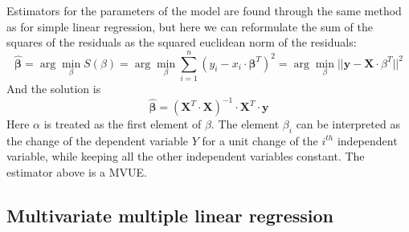 Estimators for the parameters of the model are found through the same method as for simple linear regression, but here we can reformulate the sum of the squares of the residuals as the squared euclidean norm of the residuals:
\begin{equation*}
    \hat{\boldsymbol{\beta}} = \arg \min_{\beta} S(\beta) = \arg \min_{\beta} \sum_{i=1}^n (y_i - x_i \cdot \boldsymbol{\beta}^T)^2 = \arg \min_{\beta} ||\mathbf{y} - \mathbf{X} \cdot \beta^T||^2
\end{equation*}
And the solution is
\begin{equation*}
    \hat{\boldsymbol{\beta}} = (\mathbf{X}^T \cdot \mathbf{X})^{-1} \cdot \mathbf{X}^T \cdot \mathbf{y}
\end{equation*}
Here $\alpha$ is treated as the first element of $\beta$. The element $\beta_i$ can be interpreted as the change of the dependent variable $Y$ for a unit change of the $i^{th}$ independent variable, while keeping all the other independent variables constant. The estimator above is a MVUE.

\subsection{Multivariate multiple linear regression}


